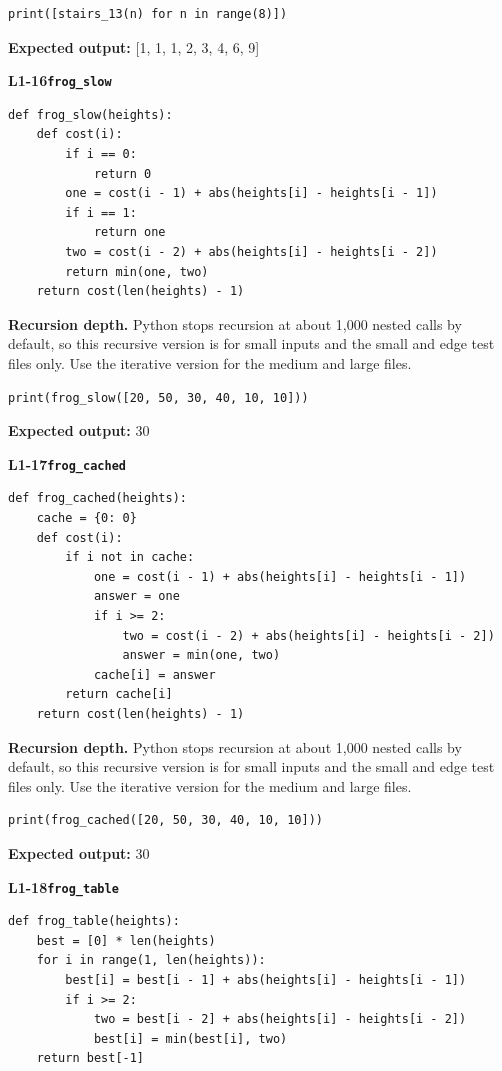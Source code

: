 \documentclass[11pt,a4paper]{article}
\begin{document}
\begin{lstlisting}
print([stairs_13(n) for n in range(8)])
\end{lstlisting}
\textbf{Expected output:} [1, 1, 1, 2, 3, 4, 6, 9]
\par\bigskip
{}
{\color{teal}\textbf{L1-16}}\quad\textbf{\texttt{frog\_slow}}\label{L1-code-frog_slow}\par
\begin{lstlisting}[style=numbered]
def frog_slow(heights):
    def cost(i):
        if i == 0:
            return 0
        one = cost(i - 1) + abs(heights[i] - heights[i - 1])
        if i == 1:
            return one
        two = cost(i - 2) + abs(heights[i] - heights[i - 2])
        return min(one, two)
    return cost(len(heights) - 1)
\end{lstlisting}
\textbf{Recursion depth.} Python stops recursion at about 1,000 nested calls by default, so this recursive version is for small inputs and the small and edge test files only. Use the iterative version for the medium and large files.


\begin{lstlisting}
print(frog_slow([20, 50, 30, 40, 10, 10]))
\end{lstlisting}
\textbf{Expected output:} 30
\par\bigskip
{}
{\color{teal}\textbf{L1-17}}\quad\textbf{\texttt{frog\_cached}}\label{L1-code-frog_cached}\par
\begin{lstlisting}[style=numbered]
def frog_cached(heights):
    cache = {0: 0}
    def cost(i):
        if i not in cache:
            one = cost(i - 1) + abs(heights[i] - heights[i - 1])
            answer = one
            if i >= 2:
                two = cost(i - 2) + abs(heights[i] - heights[i - 2])
                answer = min(one, two)
            cache[i] = answer
        return cache[i]
    return cost(len(heights) - 1)
\end{lstlisting}
\textbf{Recursion depth.} Python stops recursion at about 1,000 nested calls by default, so this recursive version is for small inputs and the small and edge test files only. Use the iterative version for the medium and large files.


\begin{lstlisting}
print(frog_cached([20, 50, 30, 40, 10, 10]))
\end{lstlisting}
\textbf{Expected output:} 30
\par\bigskip
{}
{\color{teal}\textbf{L1-18}}\quad\textbf{\texttt{frog\_table}}\label{L1-code-frog_table}\par
\begin{lstlisting}[style=numbered]
def frog_table(heights):
    best = [0] * len(heights)
    for i in range(1, len(heights)):
        best[i] = best[i - 1] + abs(heights[i] - heights[i - 1])
        if i >= 2:
            two = best[i - 2] + abs(heights[i] - heights[i - 2])
            best[i] = min(best[i], two)
    return best[-1]
\end{lstlisting}
\end{document}
